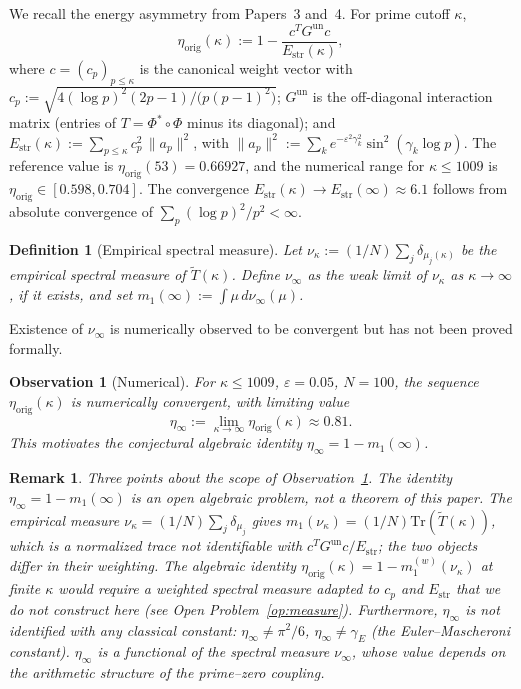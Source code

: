 \documentclass[11pt]{article}
\newtheorem{definition}[theorem]{Definition}
\newtheorem{observation}[theorem]{Observation}
\newtheorem*{remark}{Remark}
\newcommand{\Estr}{E_{\mathrm{str}}}
\newcommand{\etaorig}{\eta_{\mathrm{orig}}}
\newcommand{\Tt}{\widetilde{T}}
\newcommand{\Gun}{G^{\mathrm{un}}}
\begin{document}
We recall the energy asymmetry from Papers~3 and~4.
For prime cutoff $\kappa$,
\[
\etaorig(\kappa) := 1 - \frac{c^T \Gun c}{\Estr(\kappa)},
\]
where $c=(c_p)_{p\leq\kappa}$ is the canonical weight vector with
$c_p := \sqrt{4(\log p)^2(2p-1)\big/\bigl(p(p-1)^2\bigr)}$;
$\Gun$ is the off-diagonal interaction matrix (entries of $T=\Phi^*\circ\Phi$
minus its diagonal);
and $\Estr(\kappa):=\sum_{p\leq\kappa}c_p^2\,\|a_p\|^2$, with
$\|a_p\|^2:=\sum_k e^{-\varepsilon^2\gamma_k^2}\sin^2(\gamma_k\log p)$.
The reference value is $\etaorig(53)=0.66927$, and the numerical range
for $\kappa\leq 1009$ is $\etaorig\in[0.598,0.704]$.
The convergence $\Estr(\kappa)\to\Estr(\infty)\approx 6.1$ follows from
absolute convergence of $\sum_p(\log p)^2/p^2<\infty$.

\begin{definition}[Empirical spectral measure]
\label{def:meas}
Let $\nu_\kappa := (1/N)\sum_j\delta_{\mu_j(\kappa)}$ be the empirical
spectral measure of $\Tt(\kappa)$.
Define $\nu_\infty$ as the weak limit of $\nu_\kappa$ as $\kappa\to\infty$,
if it exists, and set $m_1(\infty):=\int\mu\,d\nu_\infty(\mu)$.
\end{definition}

Existence of $\nu_\infty$ is numerically observed to be convergent
but has not been proved formally.

\begin{observation}[Numerical]
\label{obs:etainf}
For $\kappa\leq 1009$, $\varepsilon=0.05$, $N=100$, the sequence
$\etaorig(\kappa)$ is numerically convergent, with limiting value
\[
\eta_\infty := \lim_{\kappa\to\infty}\etaorig(\kappa)\approx 0.81.
\]
This motivates the conjectural algebraic identity
$\eta_\infty = 1 - m_1(\infty)$.
\end{observation}

\begin{remark}
Three points about the scope of Observation~\ref{obs:etainf}.
The identity $\eta_\infty = 1 - m_1(\infty)$ is an open algebraic
problem, not a theorem of this paper.
The empirical measure $\nu_\kappa = (1/N)\sum_j\delta_{\mu_j}$ gives
$m_1(\nu_\kappa)=(1/N)\mathrm{Tr}(\Tt(\kappa))$,
which is a normalized trace not identifiable with
$c^T\Gun c/\Estr$; the two objects differ in their weighting.
The algebraic identity $\etaorig(\kappa)=1-m_1^{(w)}(\nu_\kappa)$ at
finite $\kappa$ would require a weighted spectral measure adapted to
$c_p$ and $\Estr$ that we do not construct here
(see Open Problem~\ref{op:measure}).
Furthermore, $\eta_\infty$ is not identified with any classical constant:
$\eta_\infty\neq\pi^2/6$, $\eta_\infty\neq\gamma_E$
(the Euler--Mascheroni constant).
$\eta_\infty$ is a functional of the spectral measure $\nu_\infty$,
whose value depends on the arithmetic structure of the prime--zero coupling.
\end{remark}
\end{document}
